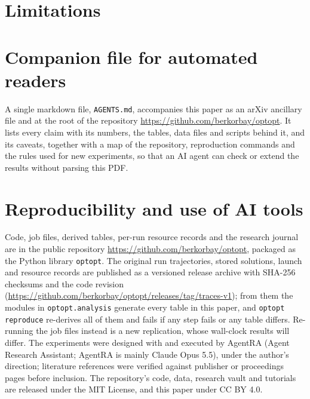 \section{Limitations}\label{app:limitations}


\section{Companion file for automated readers}\label{app:companion}
A single markdown file, \texttt{AGENTS.md}, accompanies this paper as an arXiv ancillary file and at the root of the
repository \url{https://github.com/berkorbay/optopt}. It lists every claim with its numbers, the tables, data files and
scripts behind it, and its caveats, together with a map of the repository, reproduction commands and the rules used for
new experiments, so that an AI agent can check or extend the results without parsing this PDF.

\section{Reproducibility and use of AI tools}
Code, job files, derived tables, per-run resource records and the research journal are in the
public repository \url{https://github.com/berkorbay/optopt}, packaged as the Python library \texttt{optopt}. The original run trajectories, stored solutions, launch and resource
records are published as a versioned release archive with SHA-256 checksums and the code revision
(\url{https://github.com/berkorbay/optopt/releases/tag/traces-v1}); from them the
modules in \texttt{optopt.analysis} generate every table in this paper, and \texttt{optopt reproduce} re-derives all
of them and fails if any step fails or any table differs. Re-running the job files instead is a new replication, whose
wall-clock results will differ. The experiments were designed with and executed by AgentRA (Agent Research Assistant; AgentRA is mainly Claude Opus 5.5), under the author's direction;
literature references were verified against publisher or proceedings pages before inclusion. The repository's code, data, research vault and tutorials are released under the MIT License, and this
paper under CC BY 4.0.
